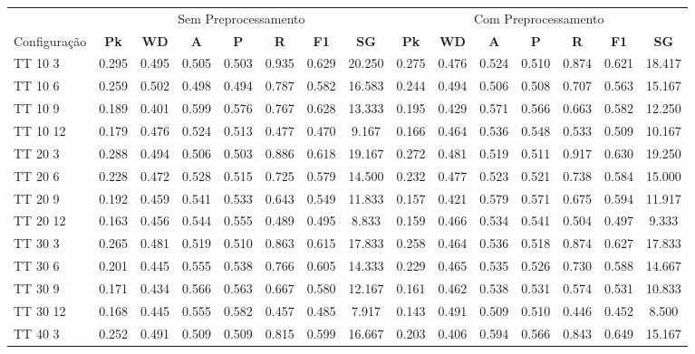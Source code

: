 \documentclass{article}
\begin{document}
 
\begin{longtable}[c]{|l|c|c|c|c|c|c|c||c|c|c|c|c|c|c|} 
\hline 
&\multicolumn{7}{c||}{Sem Preprocessamento} & \multicolumn{7}{c|}{Com Preprocessamento}\\ 
Configuração & \textbf{Pk} & \textbf{WD} & \textbf{A } & \textbf{P } & \textbf{R } & \textbf{F1} & \textbf{SG} & \textbf{Pk} & \textbf{WD} & \textbf{A } & \textbf{P } & \textbf{R } & \textbf{F1} & \textbf{SG}\\ \hline
TT 10  3 & 0.295 & 0.495 & 0.505 & 0.503 & 0.935 & 0.629 & 20.250 & 0.275 & 0.476 & 0.524 & 0.510 & 0.874 & 0.621 & 18.417\\ \hline
TT 10  6 & 0.259 & 0.502 & 0.498 & 0.494 & 0.787 & 0.582 & 16.583 & 0.244 & 0.494 & 0.506 & 0.508 & 0.707 & 0.563 & 15.167\\ \hline
TT 10  9 & 0.189 & 0.401 & 0.599 & 0.576 & 0.767 & 0.628 & 13.333 & 0.195 & 0.429 & 0.571 & 0.566 & 0.663 & 0.582 & 12.250\\ \hline
TT 10 12 & 0.179 & 0.476 & 0.524 & 0.513 & 0.477 & 0.470 & 9.167 & 0.166 & 0.464 & 0.536 & 0.548 & 0.533 & 0.509 & 10.167\\ \hline
TT 20  3 & 0.288 & 0.494 & 0.506 & 0.503 & 0.886 & 0.618 & 19.167 & 0.272 & 0.481 & 0.519 & 0.511 & 0.917 & 0.630 & 19.250\\ \hline
TT 20  6 & 0.228 & 0.472 & 0.528 & 0.515 & 0.725 & 0.579 & 14.500 & 0.232 & 0.477 & 0.523 & 0.521 & 0.738 & 0.584 & 15.000\\ \hline
TT 20  9 & 0.192 & 0.459 & 0.541 & 0.533 & 0.643 & 0.549 & 11.833 & 0.157 & 0.421 & 0.579 & 0.571 & 0.675 & 0.594 & 11.917\\ \hline
TT 20 12 & 0.163 & 0.456 & 0.544 & 0.555 & 0.489 & 0.495 & 8.833 & 0.159 & 0.466 & 0.534 & 0.541 & 0.504 & 0.497 & 9.333\\ \hline
TT 30  3 & 0.265 & 0.481 & 0.519 & 0.510 & 0.863 & 0.615 & 17.833 & 0.258 & 0.464 & 0.536 & 0.518 & 0.874 & 0.627 & 17.833\\ \hline
TT 30  6 & 0.201 & 0.445 & 0.555 & 0.538 & 0.766 & 0.605 & 14.333 & 0.229 & 0.465 & 0.535 & 0.526 & 0.730 & 0.588 & 14.667\\ \hline
TT 30  9 & 0.171 & 0.434 & 0.566 & 0.563 & 0.667 & 0.580 & 12.167 & 0.161 & 0.462 & 0.538 & 0.531 & 0.574 & 0.531 & 10.833\\ \hline
TT 30 12 & 0.168 & 0.445 & 0.555 & 0.582 & 0.457 & 0.485 & 7.917 & 0.143 & 0.491 & 0.509 & 0.510 & 0.446 & 0.452 & 8.500\\ \hline
TT 40  3 & 0.252 & 0.491 & 0.509 & 0.509 & 0.815 & 0.599 & 16.667 & 0.203 & 0.406 & 0.594 & 0.566 & 0.843 & 0.649 & 15.167\\ \hline

\end{longtable}
\end{document}
